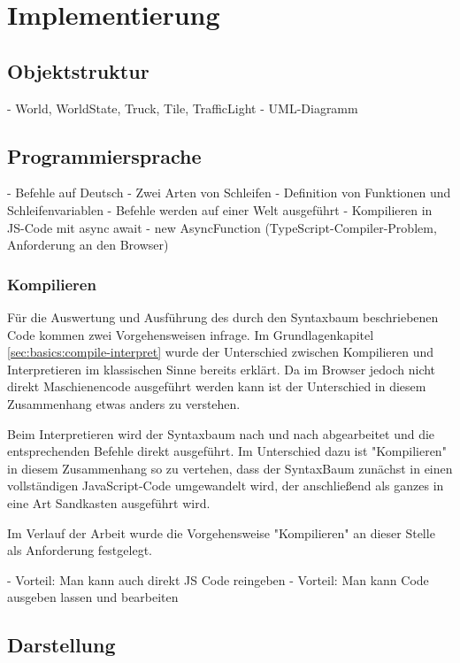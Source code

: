 \chapter{Implementierung}
\label{sec:implementation}

\section{Objektstruktur}

- World, WorldState, Truck, Tile, TrafficLight
- UML-Diagramm

\section{Programmiersprache}

- Befehle auf Deutsch
- Zwei Arten von Schleifen
- Definition von Funktionen und Schleifenvariablen
- Befehle werden auf einer Welt ausgeführt
- Kompilieren in JS-Code mit async await
- new AsyncFunction (TypeScript-Compiler-Problem, Anforderung an den Browser)

\subsection{Kompilieren}
Für die Auswertung und Ausführung des durch den Syntaxbaum beschriebenen Code kommen zwei Vorgehensweisen infrage. Im Grundlagenkapitel \ref{sec:basics:compile-interpret} wurde der Unterschied zwischen Kompilieren und Interpretieren im klassischen Sinne bereits erklärt. Da im Browser jedoch nicht direkt Maschienencode ausgeführt werden kann ist der Unterschied in diesem Zusammenhang etwas anders zu verstehen.

Beim Interpretieren wird der Syntaxbaum nach und nach abgearbeitet und die entsprechenden Befehle direkt ausgeführt. Im Unterschied dazu ist "Kompilieren" in diesem Zusammenhang so zu vertehen, dass der SyntaxBaum zunächst in einen vollständigen JavaScript-Code umgewandelt wird, der anschließend als ganzes in eine Art Sandkasten ausgeführt wird.

Im Verlauf der Arbeit wurde die Vorgehensweise "Kompilieren" an dieser Stelle als Anforderung festgelegt.

- Vorteil: Man kann auch direkt JS Code reingeben
- Vorteil: Man kann Code ausgeben lassen und bearbeiten

\section{Darstellung}

